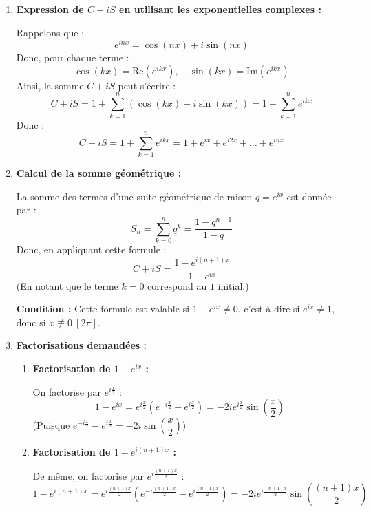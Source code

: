 \documentclass[a4paper,12pt]{article}
\begin{document}
\begin{solutionbox}
\begin{enumerate}
    \item \textbf{Expression de \( C + iS \) en utilisant les exponentielles complexes :}

    Rappelons que :
    \[
    e^{inx} = \cos(nx) + i \sin(nx)
    \]
    Donc, pour chaque terme :
    \[
    \cos(kx) = \text{Re}(e^{ikx}), \quad \sin(kx) = \text{Im}(e^{ikx})
    \]
    Ainsi, la somme \( C + iS \) peut s'écrire :
    \[
    C + iS = 1 + \sum_{k=1}^n \left( \cos(kx) + i \sin(kx) \right ) = 1 + \sum_{k=1}^n e^{ikx}
    \]
    Donc :
    \[
    C + iS = 1 + \sum_{k=1}^n e^{ikx} = 1 + e^{ix} + e^{i2x} + \dots + e^{inx}
    \]

    \item \textbf{Calcul de la somme géométrique :}

    La somme des termes d'une suite géométrique de raison \( q = e^{ix} \) est donnée par :
    \[
    S_n = \sum_{k=0}^n q^k = \dfrac{1 - q^{n+1}}{1 - q}
    \]
    Donc, en appliquant cette formule :
    \[
    C + iS = \dfrac{1 - e^{i(n+1)x}}{1 - e^{ix}}
    \]
    (En notant que le terme \( k = 0 \) correspond au \( 1 \) initial.)

    \textbf{Condition :} Cette formule est valable si \( 1 - e^{ix} \neq 0 \), c'est-à-dire si \( e^{ix} \neq 1 \), donc si \( x \not\equiv 0 \ [2\pi] \).

    \item \textbf{Factorisations demandées :}

    \begin{enumerate}
        \item \textbf{Factorisation de \( 1 - e^{ix} \) :}

        On factorise par \( e^{i \frac{x}{2}} \) :
        \[
        1 - e^{ix} = e^{i \frac{x}{2}} \left( e^{-i \frac{x}{2}} - e^{i \frac{x}{2}} \right ) = -2 i e^{i \frac{x}{2}} \sin\left( \dfrac{x}{2} \right )
        \]
        (Puisque \( e^{-i \frac{x}{2}} - e^{i \frac{x}{2}} = -2 i \sin\left( \dfrac{x}{2} \right ) \))

        \item \textbf{Factorisation de \( 1 - e^{i(n+1)x} \) :}

        De même, on factorise par \( e^{i \frac{(n+1)x}{2}} \) :
        \[
        1 - e^{i(n+1)x} = e^{i \frac{(n+1)x}{2}} \left( e^{-i \frac{(n+1)x}{2}} - e^{i \frac{(n+1)x}{2}} \right ) = -2 i e^{i \frac{(n+1)x}{2}} \sin\left( \dfrac{(n+1)x}{2} \right )
        \]


\end{enumerate}
\end{enumerate}
\end{solutionbox}
\end{document}

